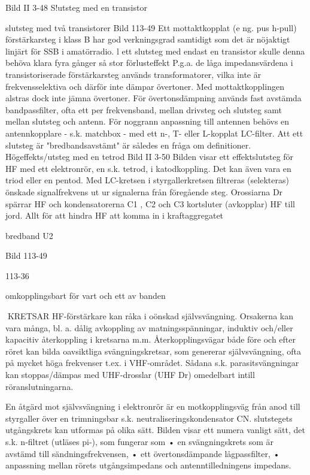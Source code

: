 {{Bild II 3-48 S!utsteg med en transistor

slutsteg med två transistorer
Bild 113-49
Ett mottaktkopplat (e ng. pus h-pull) förstärkarsteg i klass B har god verkningsgrad
samtidigt som det är nöjaktigt linjärt för SSB
i amatörradio. l ett slutsteg med endast en
transistor skulle denna behöva klara fyra
gånger så stor förlusteffekt
P.g.a. de låga impedansvärdena i transistoriserade förstärkarsteg används transformatorer, vilka inte är frekvensselektiva
och därför inte dämpar övertoner. Med mottaktkopplingen alstras dock inte jämna övertoner. För övertonsdämpning används fast
avstämda bandpassfilter, ofta ett per frekvensband, mellan drivsteg och slutsteg samt
mellan slutsteg och antenn.
För noggrann anpassning till antennen
behövs en antennkopplare - s.k. matchbox
- med ett n-, T- eller L-kopplat LC-filter.
Att ett slutsteg är "bredbandsavstämt" är
således en fråga om definitioner.
Högeffekts/utsteg med en tetrod
Bild II 3-50
Bilden visar ett effektslutsteg för HF med ett
elektronrör, en s.k. tetrod, i katodkoppling.
Det kan även vara en triod eller en pentod.
Med LC-kretsen i styrgallerkretsen filtreras (selekteras) önskade signalfrekvens ut
ur signalerna från föregående steg.
Orossiarna Dr spärrar HF och kondensatorerna C1 , C2 och C3 kortsluter (avkopplar)
HF till jord. Allt för att hindra HF att komma in
i kraftaggregatet

bredband
U2

Bild 113-49

113-36

omkopplingsbart för
vart och ett av banden

KRETSAR
HF-förstärkare kan råka i oönskad självsvängning. Orsakerna kan vara många, bl. a.
dålig avkoppling av matningsspänningar, induktiv och/eller kapacitiv återkoppling i kretsarna m.m.
Återkopplingsvägar både före och efter
röret kan bilda oavsiktliga svängningskretsar, som genererar självsvängning, ofta på
mycket höga frekvenser t.ex. i VHF-området. Sådana s.k. parasitsvängningar kan
stoppas/dämpas med UHF-drosslar (UHF
Dr) omedelbart intill röranslutningarna.

En åtgärd mot självsvängning i elektronrör är en motkopplingsväg från anod till styrgaller över en trimningsbar s.k. neutraliseringskondensator CN.
slutstegets utgångskrets kan utformas
på olika sätt. Bilden visar ett numera vanligt
sätt, det s.k. n-filtret (utläses pi-), som fungerar som
• en svängningskrets som är avstämd till
sändningsfrekvensen,
• ett övertonsdämpande lågpassfilter,
• anpassning mellan rörets utgångsimpedans och antenntilledningens impedans.

}}
